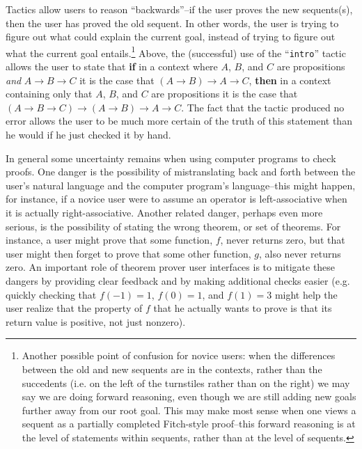 \documentclass[11pt]{amsart}
\newcommand{\ra}{\ensuremath{\rightarrow}}
\begin{document}
Tactics allow users to reason ``backwards''--if the user proves the new sequents(s), then the user has proved the old sequent.  In other words, the user is trying to figure out what could explain the current goal, instead of trying to figure out what the current goal entails.\footnote{Another possible point of confusion for novice users:  when the differences between the old and new sequents are in the contexts, rather than the succedents (i.e. on the left of the turnstiles rather than on the right) we may say we are doing forward reasoning, even though we are still adding new goals further away from our root goal.  This may make most sense when one views a sequent as a partially completed Fitch-style proof--this forward reasoning is at the level of statements within sequents, rather than at the level of sequents.}  Above, the (successful) use of the ``\texttt{intro}'' tactic allows the user to state that {\bf if} in a context where $A$, $B$, and $C$ are propositions \textit{and} $A \ra B \ra C$ it is the case that $(A \ra B) \ra A \ra C$, {\bf then} in a context containing only that $A$, $B$, and $C$ are propositions it is the case that $(A \ra B \ra C) \ra (A \ra B) \ra A \ra C$.  The fact that the tactic produced no error allows the user to be much more certain of the truth of this statement than he would if he just checked it by hand.

In general some uncertainty remains when using computer programs to check proofs. One danger is the possibility of mistranslating back and forth between the user's natural language and the computer program's language--this might happen, for instance, if a novice user were to assume an operator is left-associative when it is actually right-associative.  Another related danger, perhaps even more serious, is the possibility of stating the wrong theorem, or set of theorems.  For instance, a user might prove that some function, $f$, never returns zero, but that user might then forget to prove that some other function, $g$, also never returns zero.  An important role of theorem prover user interfaces is to mitigate these dangers by providing clear feedback and by making additional checks easier (e.g. quickly checking that $f(-1) = 1$, $f(0) = 1$, and $f(1) = 3$ might help the user realize that the property of $f$ that he actually wants to prove is that its return value is positive, not just nonzero).

\end{document}

